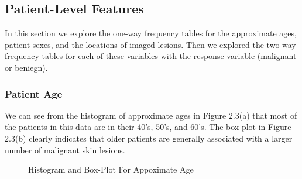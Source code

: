 \documentclass [MAS] {uclathes}
\begin{document}
\subsection{Patient-Level Features}

In this section we explore the one-way frequency tables for the approximate ages, patient sexes, and the locations of imaged lesions. Then we explored the two-way frequency tables for each of these variables with the response variable (malignant or beniegn).

\subsubsection*{Patient Age}

We can see from the histogram of approximate ages in Figure 2.3(a) that most of the patients in this data are in their 40's, 50's, and 60's. The box-plot in Figure 2.3(b) clearly indicates that older patients are generally associated with a larger number of malignant skin lesions.

\begin{figure}[hbt!]
\hspace*{\fill}
\centering
{}\hspace{0.5em}
\hspace*{\fill}
\label{fig:age_eda}
\vspace{0cm}
\caption{Histogram and Box-Plot For Appoximate Age}
\end{figure}
\end{document}
